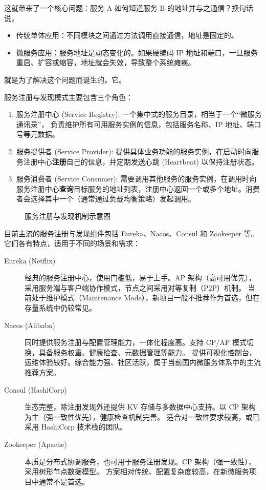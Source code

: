 这就带来了一个核心问题：服务 A 如何知道服务 B 的地址并与之通信？换句话说，
\begin{itemize}
    \item 传统单体应用：不同模块之间通过方法调用直接通信，地址是固定的。
    \item 微服务应用：服务地址是动态变化的。如果硬编码 IP 地址和端口，一旦服务重启、扩容或缩容，地址就会失效，导致整个系统瘫痪。
\end{itemize}

就是为了解决这个问题而诞生的。它。

服务注册与发现模式主要包含三个角色：

\begin{enumerate}
    \item 服务注册中心 (Service Registry): 一个集中式的服务目录，相当于一个``微服务通讯录''，
        负责维护所有可用服务实例的信息，包括服务名称、IP 地址、端口号等元数据。
    \item 服务提供者 (Service Provider): 提供具体业务功能的服务实例，在启动时向服务注册中心\textbf{注册}自己的信息，并定期发送心跳 (Heartbeat) 以保持注册状态。
    \item 服务消费者 (Service Consumer): 需要调用其他服务的服务实例，在调用时向服务注册中心\textbf{查询}目标服务的地址列表，注册中心返回一个或多个地址。消费者会选择其中一个（通常通过负载均衡策略）发起调用。
\end{enumerate}

\begin{figure}[h]
    \centering
    
    \caption{服务注册与发现机制示意图}
    \label{fig:service-registration-discovery}
\end{figure}



目前主流的服务注册与发现组件包括 Eureka、Nacos、Consul 和 Zookeeper 等。它们各有特点，适用于不同的场景和需求：
\begin{description}
    \item[Eureka (Netflix)] 经典的服务注册中心，使用门槛低，易于上手。AP 架构（高可用优先），采用服务端与客户端协作模式，节点之间采用对等复制（P2P）机制。
        当前处于维护模式（Maintenance Mode），新项目一般不推荐作为首选，但在存量系统中仍较常见。
    \item[Nacos (Alibaba)] 同时提供服务注册与配置管理能力，一体化程度高。支持 CP/AP 模式切换，具备服务权重、健康检查、元数据管理等能力。
        提供可视化控制台，运维体验较好。综合能力强、社区活跃，属于当前国内微服务体系中的主流推荐方案。
    \item[Consul (HashiCorp)] 生态完整，除注册发现外还提供 KV 存储与多数据中心支持。以 CP 架构为主（强一致性优先），健康检查机制完善。
        适合对一致性要求较高，或已采用 HashiCorp 技术栈的团队。
    \item[Zookeeper (Apache)] 本质是分布式协调服务，也可用于服务注册发现。CP 架构（强一致性），采用树形节点数据模型。
        方案相对传统、配置复杂度较高，在新微服务项目中通常不是首选。
\end{description}


